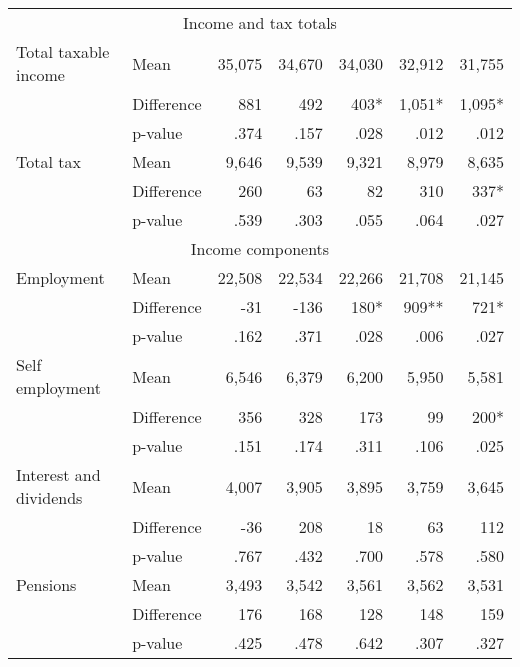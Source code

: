 {\begin{tabular}{llrrrrr}
  \multicolumn{7}{c}{\rule{0pt}{3ex}Income and tax totals}                                   \\
  Total taxable income   & Mean       & 35,075   & 34,670   & 34,030   & 32,912   & 31,755   \\
                                & Difference & 881          & 492      & 403*     & 1,051*   & 1,095*   \\
                         & p-value    & ~.374    & ~.157    & ~.028    & ~.012    & ~.012    \\
  Total tax              & Mean       & 9,646    & 9,539    & 9,321    & 8,979    & 8,635    \\
                         & Difference & 260      & 63       & 82       & 310      & 337*     \\
                         & p-value    & ~.539    & ~.303    & ~.055    & ~.064    & ~.027    \\
  \multicolumn{7}{c}{\rule{0pt}{3ex}Income components}                                       \\
  Employment             & Mean       & 22,508   & 22,534   & 22,266   & 21,708   & 21,145   \\
                         & Difference & -31      & -136     & 180*     & 909**    & 721*     \\
                         & p-value    & ~.162    & ~.371    & ~.028    & ~.006    & ~.027    \\
  Self employment        & Mean       & 6,546    & 6,379    & 6,200    & 5,950    & 5,581    \\
                         & Difference & 356      & 328      & 173      & 99       & 200*     \\
                         & p-value    & ~.151    & ~.174    & ~.311    & ~.106    & ~.025    \\
  Interest and dividends & Mean       & 4,007    & 3,905    & 3,895    & 3,759    & 3,645    \\
                         & Difference & -36      & 208      & 18       & 63       & 112      \\
                         & p-value    & ~.767    & ~.432    & ~.700    & ~.578    & ~.580    \\
  Pensions               & Mean       & 3,493    & 3,542    & 3,561    & 3,562    & 3,531    \\
                         & Difference & 176      & 168      & 128      & 148      & 159      \\
                         & p-value    & ~.425    & ~.478    & ~.642    & ~.307    & ~.327    \\

\end{tabular}}
